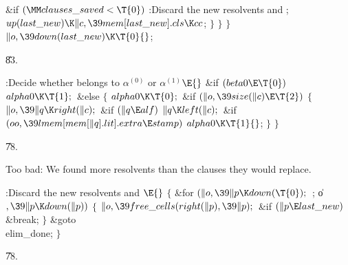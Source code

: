 \&{if} ${}(\MM\\{clauses\_saved}<\T{0}){}$\1\5
:Discard the new resolvents and \X;\2\6
${}\\{up}(\\{last\_new})\K\|c,\39\\{mem}[\\{last\_new}].\\{cls}\K\\{cc}{}$;\6
\4${}\}{}$\2\6
\4${}\}{}$\2\6
\4${}\}{}$\2\6
${}\|o,\39\\{down}(\\{last\_new})\K\T{0}{}$;\par
\U83.\fi

\B{}:Decide whether  belongs to $\alpha^{(0)}$ or
$\alpha^{(1)}$\X${}\E{}$\6
\&{if} ${}(\\{beta0}\E\T{0}){}$\1\5
${}\\{alpha0}\K\T{1};{}$\2\6
\&{else}\5
${}\{{}$\1\6
${}\\{alpha0}\K\T{0};{}$\6
\&{if} ${}(\|o,\39\\{size}(\|c)\E\T{2}){}$\5
${}\{{}$\1\6
${}\|o,\39\|q\K\\{right}(\|c);{}$\6
\&{if} ${}(\|q\E\\{alf}){}$\1\5
${}\|q\K\\{left}(\|c);{}$\2\6
\&{if} ${}(\\{oo},\39\\{lmem}[\\{mem}[\|q].\\{lit}].\\{extra}\E\\{stamp}){}$\1\5
${}\\{alpha0}\K\T{1}{}$;\2\6
\4${}\}{}$\2\6
\4${}\}{}$\2\par
\U78.\fi

Too bad: We found more resolvents than the clauses they
would replace.

\Y\B\4:Discard the new resolvents and \X${}%
\E{}$\6
${}\{{}$\1\6
\&{for} ${}(\|o,\39\|p\K\\{down}(\T{0});{}$  ; \|o${},\39\|p\K\\{down}(\|p)){}$%
\5
${}\{{}$\1\6
${}\|o,\39\\{free\_cells}(\\{right}(\|p),\39\|p);{}$\6
\&{if} ${}(\|p\E\\{last\_new}){}$\1\5
\&{break};\2\6
\4${}\}{}$\2\6
\&{goto} \\{elim\_done};\6
\4${}\}{}$\2\par
\U78.\fi

